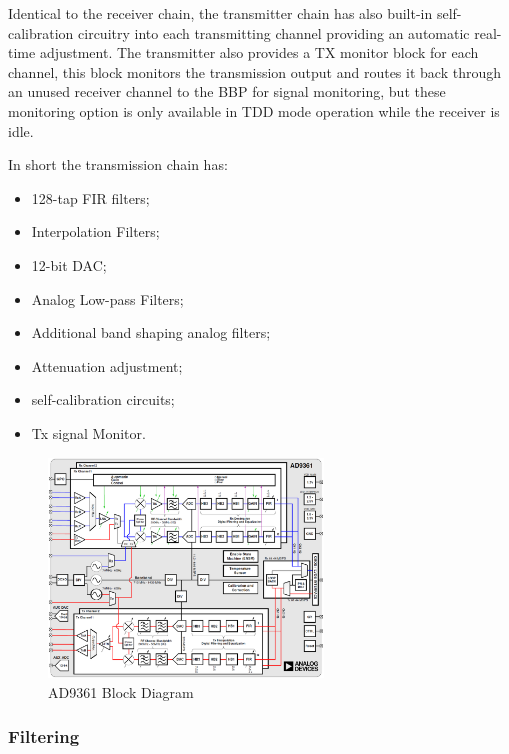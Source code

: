 Identical to the receiver chain, the transmitter chain has also built-in self-calibration circuitry into each transmitting channel providing an automatic real-time adjustment. The transmitter also provides a TX monitor block for each channel, this block monitors the transmission output and routes it back through an unused receiver channel to the BBP for signal monitoring, but these monitoring option is only available in TDD mode operation while the receiver is idle.

In short the transmission chain has:

\begin{itemize}
	\item 128-tap FIR filters;
	\item Interpolation Filters;
	\item 12-bit DAC;
	\item Analog Low-pass Filters;
	\item Additional band shaping analog filters;
	\item Attenuation adjustment;
	\item self-calibration circuits;
	\item Tx signal Monitor.
\end{itemize}

\begin{figure}[htbp]
    \centering
    \includegraphics[width=0.65\textwidth]{./figures/ad9361_block_diagram}
    \caption{ AD9361 Block Diagram
    \label{fig:ad9361blk}}
\end{figure}

\subsubsection{Filtering}

